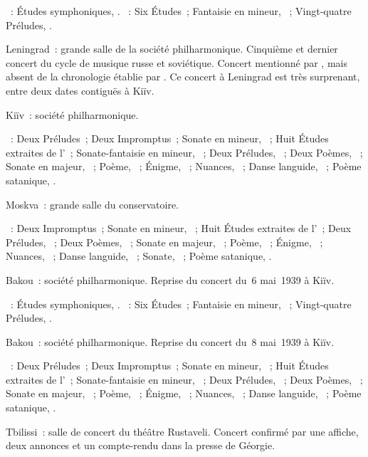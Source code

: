 \begin{description}
 \textsc{\Schumann{}}~: Études symphoniques, .
 \textsc{\Chopin{}}~: Six Études~; Fantaisie en \kF mineur, ~;
 Vingt-quatre Préludes, .
 \item[\DateWithWeekDay{1939-05-07}]
 Leningrad~: grande salle de la société philharmonique.
 Cinquième et dernier concert du cycle de musique russe et soviétique.
 Concert mentionné par \citet[p.~160]{Nekrasova08}, mais absent de la
 chronologie établie par \citet[p.~414]{Scriabine}.
 Ce concert à Leningrad est très surprenant, entre deux dates contiguës à
 Kiïv.
 \item[\DateWithWeekDay{1939-05-08}]
 Kiïv~: société philharmonique.

 \textsc{\Scriabine{}}~: Deux Préludes~; Deux Impromptus~; Sonate en \kF
 \Sharp mineur, ~; Huit Études extraites de l'~;
 Sonate-fantaisie en \kG \Sharp mineur, ~; Deux Préludes,
 ~; Deux Poèmes, ~; Sonate en \kF \Sharp majeur,
 ~; Poème,  ~; Énigme,  ~;
 Nuances,  ~; Danse languide,  ~;
 Poème satanique, .
 \item[\DateWithWeekDay{1939-05-18}]
 Moskva~: grande salle du conservatoire.

 \textsc{\Scriabine{}}~: Deux Impromptus~; Sonate en \kF \Sharp mineur,
 ~; Huit Études extraites de l'~; Deux Préludes,
 ~; Deux Poèmes, ~; Sonate en \kF \Sharp majeur,
 ~; Poème,  ~; Énigme,  ~;
 Nuances,  ~; Danse languide,  ~;
 Sonate, ~; Poème satanique, .
 \item[\DateWithWeekDay{1939-05-24}]
 Bakou~: société philharmonique.
 Reprise du concert du~6 mai~1939 à Kiïv.

 \textsc{\Schumann{}}~: Études symphoniques, .
 \textsc{\Chopin{}}~: Six Études~; Fantaisie en \kF mineur, ~;
 Vingt-quatre Préludes, .
 \item[\DateWithWeekDay{1939-05-26}]
 Bakou~: société philharmonique.
 Reprise du concert du~8 mai~1939 à Kiïv.

 \textsc{\Scriabine{}}~: Deux Préludes~; Deux Impromptus~; Sonate en \kF
 \Sharp mineur, ~; Huit Études extraites de l'~;
 Sonate-fantaisie en \kG \Sharp mineur, ~; Deux Préludes,
 ~; Deux Poèmes, ~; Sonate en \kF \Sharp majeur,
 ~; Poème,  ~; Énigme,  ~;
 Nuances,  ~; Danse languide,  ~;
 Poème satanique, .
 \item[\DateWithWeekDay{1939-05-28}]
 Tbilissi~: salle de concert du théâtre Rustaveli.
 Concert confirmé par une affiche, deux annonces et un compte-rendu dans la
 presse de Géorgie.


\end{description}
